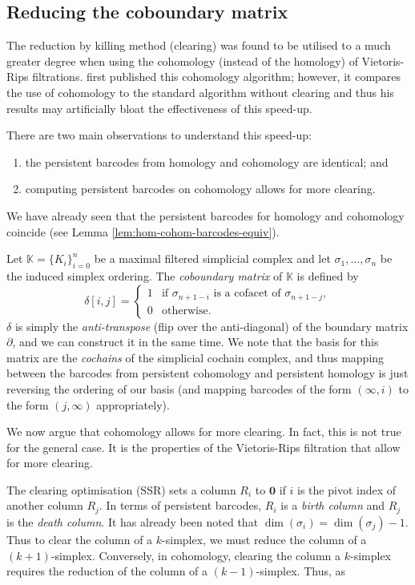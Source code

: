 \subsection{Reducing the coboundary matrix}

The reduction by killing method (clearing) was found to be utilised to a much greater degree when using the cohomology (instead of the homology) of Vietoris-Rips filtrations. \textcite{de2011dualities} first published this cohomology algorithm; however, it compares the use of cohomology to the standard algorithm without clearing and thus his results may artificially bloat the effectiveness of this speed-up.

There are two main observations to understand this speed-up:
\begin{enumerate}
  \item the persistent barcodes from homology and cohomology are identical; and
  \item computing persistent barcodes on cohomology allows for more clearing.
\end{enumerate}

We have already seen that the persistent barcodes for homology and cohomology coincide (see Lemma \ref{lem:hom-cohom-barcodes-equiv}).

Let $\mathbb K = \{K_i\}_{i=0}^n$ be a maximal filtered simplicial complex and let $\sigma_1, \ldots, \sigma_n$ be the induced simplex ordering. The \emph{coboundary matrix} of $\mathbb K$ is defined by
\[ 
  \delta[i, j] = 
  \begin{cases}
    1 & \text{if $\sigma_{n+1-i}$ is a cofacet of $\sigma_{n+1-j}$}, \\
    0 & \text{otherwise}.
  \end{cases} 
\]
$\delta$ is simply the \emph{anti-transpose} (flip over the anti-diagonal) of the boundary matrix $\partial$, and we can construct it in the same time. We note that the basis for this matrix are the \emph{cochains} of the simplicial cochain complex, and thus mapping between the barcodes from persistent cohomology and persistent homology is just reversing the ordering of our basis (and mapping barcodes of the form $(\infty, i)$ to the form $(j, \infty)$ appropriately).

We now argue that cohomology allows for more clearing. In fact, this is not true for the general case. It is the properties of the Vietoris-Rips filtration that allow for more clearing. 

The clearing optimisation (\textsc{SSR}) sets a column $R_i$ to $\bm 0$ if $i$ is the pivot index of another column $R_j$. In terms of persistent barcodes, $R_i$ is a \emph{birth column} and $R_j$ is the \emph{death column}. It has already been noted that $\dim(\sigma_i) = \dim(\sigma_j) - 1$. Thus to clear the column of a $k$-simplex, we must reduce the column of a $(k+1)$-simplex. Conversely, in cohomology, clearing the column a $k$-simplex requires the reduction of the column of a $(k-1)$-simplex. Thus, as 

